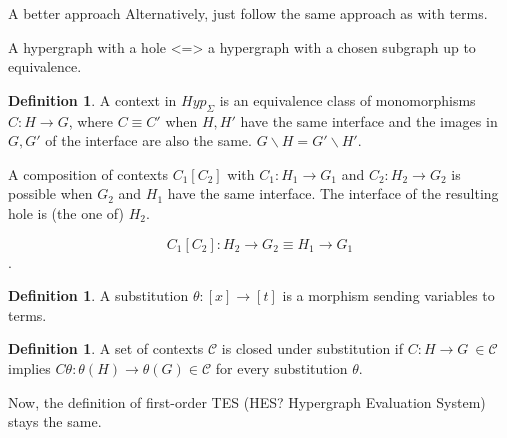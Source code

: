 \documentclass{article}
\theoremstyle{plain}
\theoremstyle{definition}
\newtheorem{mydefinition}[mytheorem]{Definition}
\begin{document}
\begin{section}{A better approach}
Alternatively, just follow the same approach as with terms.

A hypergraph with a hole <=> a hypergraph with a chosen subgraph up to equivalence.

\begin{mydefinition}
    A context in $Hyp_{\Sigma}$ is an equivalence class of monomorphisms $C: H \rightarrow G$, where $C \equiv C'$ when $H, H'$ have the same interface and the images in $G, G'$ of the interface are also the same. $G \backslash H = G' \backslash H'$.
\end{mydefinition}

A composition of contexts $C_1[C_2]$ with $C_1: H_1 \rightarrow G_1$ and $C_2: H_2 \rightarrow G_2$ is possible when $G_2$ and $H_1$ have the same interface. The interface of the resulting hole is (the one of) $H_2$.

\[C_1[C_2]: H_2 \rightarrow G_2 \equiv H_1 \rightarrow G_1\].

\begin{mydefinition}
    A substitution $\theta: [x] \rightarrow [t]$ is a morphism sending variables to terms. 
\end{mydefinition}

\begin{mydefinition}
    A set of contexts $\mathcal{C}$ is closed under substitution if $C: H \rightarrow G \ \in \mathcal{C}$ implies $C\theta: \theta(H) \rightarrow \theta(G) \in \mathcal{C}$ for every substitution $\theta$.
\end{mydefinition}

Now, the definition of first-order TES (HES? Hypergraph Evaluation System) stays the same.



\end{section}
\end{document}
